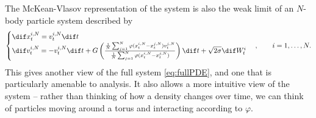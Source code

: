 \documentclass[11pt, a4pape draft]{article}
\renewcommand{\phi}{\varphi}
\begin{document}
        The McKean-Vlasov representation of the system is also the weak limit of an $N$-body particle system described by
        \begin{equation}\label{eq:full_particle}\begin{cases}
            \dif x^{i,N}_t = v^{i,N}_t\dif t\\
            \dif v^{i,N}_t = -v^{i,N}_t\dif t + G\left(\frac{\frac{1}{N}\sum_{j=1}^N \phi(x_t^{i,N} - x_t^{j,N})v^{j,N}_t  }{\frac{1}{N}\sum_{j=1}^N \phi(x_t^{i,N} - x_t^{j,N})}\right)\dif t + \sqrt{2\sigma} \dif W^i_t 
            \end{cases}, \qquad  i = 1,\dots,N.
        \end{equation}
        This gives another view of the full system \eqref{eq:fullPDE}, and one that is particularly amenable to analysis. It also allows a more intuitive view of the system -- rather than thinking of how a density changes over time, we can think of particles moving around a torus and interacting according to $\phi$.
        
\end{document}
